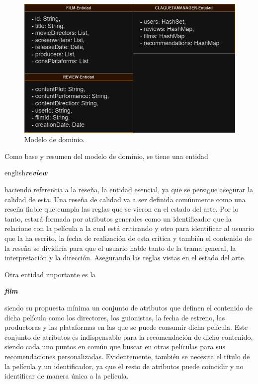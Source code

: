 \begin{figure}[h]
    \centering
    \includegraphics[width=\linewidth]{imagenes/Modelo_Dominio_Claqueta_TFG.drawio.png}
    \caption{Modelo de dominio.}
    \label{fig:diagrama}
\end{figure}



Como base y resumen del modelo de dominio, se tiene una entidad \begin{otherlanguage}
{english}\textit{\textbf{review }}\end{otherlanguage}haciendo referencia a la reseña, la entidad 
esencial, ya que se persigue asegurar la calidad de esta. Una reseña de calidad va a ser definida 
comúnmente como una reseña fiable que cumpla las reglas que se vieron en el estado del arte. Por lo tanto, 
estará formada por atributos generales como un identificador que la relacione con la 
película a la cual está criticando y otro para identificar al usuario que la ha escrito, la fecha de 
realización de esta crítica y también el contenido de la reseña se dividiría para que el usuario hable tanto de la 
trama general, la interpretación y la dirección. Asegurando las reglas vistas en el estado del arte.

Otra entidad importante es la \begin{otherlanguage}{english}\textit{\textbf{film }}\end{otherlanguage} 
siendo su propuesta mínima un conjunto de atributos que definen el contenido de dicha película como los 
directores, los guionistas, la fecha de estreno, las productoras y las plataformas en las que se puede 
consumir dicha película. Este conjunto de atributos es indispensable para la recomendación de dicho 
contenido, siendo cada uno puntos en común que buscar en otras películas para sus recomendaciones 
personalizadas. Evidentemente, también se necesita el título de la película y un identificador, ya que el 
resto de atributos puede coincidir y no identificar de manera única a la película.

